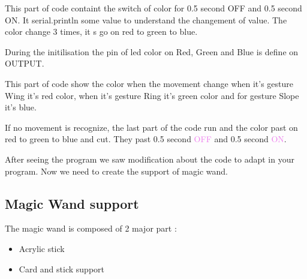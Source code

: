 This part of code containt the switch of color for 0.5 second OFF and 0.5 second ON. It serial.println some value to understand the changement of value. The color change 3 times, it s go on red to green to blue. 

\begin{center}
    \label{Code:ArduinoModif3}
\end{center}


During the initilisation the pin of led color on Red, Green and Blue is define on OUTPUT. 


\begin{center}
    \label{Code:ArduinoModif4}
\end{center}

This part of code show the color when the movement change when it's gesture Wing it's red color, when it's gesture Ring it's green color and for gesture Slope it's blue. 

If no movement is recognize, the last part of the code run and the color past on red to green to blue and cut. They past 0.5 second \textcolor{violet}{OFF} and 0.5 second \textcolor{violet}{ON}. 

\begin{center}
    \label{Code:ArduinoModif5}
\end{center}


After seeing the program we saw modification about the code to adapt in your program. Now we need to create the support of magic wand. 

\subsection{Magic Wand support}

The magic wand is composed of 2 major part : 

\begin{itemize}
    \item Acrylic stick
    \item Card and stick support
\end{itemize}

